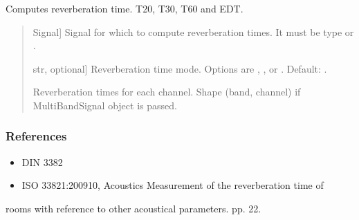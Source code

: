 \documentclass[letterpaper,10pt,english]{sphinxmanual}
\begin{document}
\begin{fulllineitems}
\label{\detokenize{modules/dsptoolbox.room_acoustics:dsptoolbox.room_acoustics.reverb_time}}
\pysigstartsignatures
{}
\pysigstopsignatures
\sphinxAtStartPar
Computes reverberation time. T20, T30, T60 and EDT.
\begin{quote}\begin{description}
\begin{description}
\sphinxlineitem{\sphinxstylestrong{signal}}{[}Signal{]}
\sphinxAtStartPar
Signal for which to compute reverberation times. It must be type
 or .

\sphinxlineitem{\sphinxstylestrong{mode}}{[}str, optional{]}
\sphinxAtStartPar
Reverberation time mode. Options are , ,  or
. Default: .

\end{description}

\begin{description}
\sphinxlineitem{\sphinxstylestrong{reverberation\_times}}{[}\sphinxtitleref{np.ndarray}{]}
\sphinxAtStartPar
Reverberation times for each channel. Shape (band, channel)
if MultiBandSignal object is passed.

\end{description}

\end{description}\end{quote}
\subsubsection*{References}
\begin{itemize}
\item {} 
\sphinxAtStartPar
DIN 3382

\item {} 
\sphinxAtStartPar
ISO 3382\sphinxhyphen{}1:2009\sphinxhyphen{}10, Acoustics \sphinxhyphen{} Measurement of the reverberation time of

\end{itemize}

\sphinxAtStartPar
rooms with reference to other acoustical parameters. pp. 22.

\end{fulllineitems}
\end{document}
